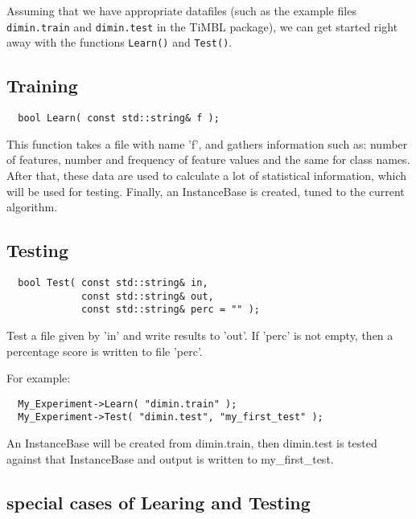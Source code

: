 \documentclass{report}
\begin{document}
Assuming that we have appropriate datafiles (such as the example files {\tt
dimin.train} and {\tt dimin.test} in the TiMBL package), we can get
started right away with the functions {\tt Learn()} and {\tt Test()}.

\subsection{Training}
\begin{footnotesize}
\begin{verbatim}
  bool Learn( const std::string& f );
\end{verbatim}
\end{footnotesize}

This function takes a file with name 'f', and gathers information
such as: number of features, number and frequency of feature values and
the same for class names. After that, these data are used to calculate
a lot of statistical information, which will be used for
testing. Finally, an InstanceBase is created, tuned to the current
algorithm.

\subsection{Testing}
\begin{footnotesize}
\begin{verbatim}
  bool Test( const std::string& in,
             const std::string& out,
             const std::string& perc = "" );
\end{verbatim}
\end{footnotesize}

Test a file given by 'in' and write results to 'out'. If 'perc' is not
empty, then a percentage score is written to file 'perc'.

For example:

\begin{footnotesize}
\begin{verbatim}
  My_Experiment->Learn( "dimin.train" );  
  My_Experiment->Test( "dimin.test", "my_first_test" );  
\end{verbatim}
\end{footnotesize}

An InstanceBase will be created from dimin.train, then dimin.test is
tested against that InstanceBase and output is written to
my\_first\_test.

\subsection{special cases of Learing and Testing}
\end{document}
